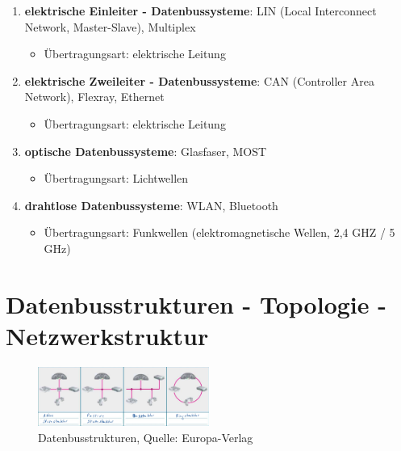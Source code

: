 \begin{enumerate}
\item
  \textbf{elektrische Einleiter - Datenbussysteme}: LIN (Local
  Interconnect Network, Master-Slave), Multiplex

  \begin{itemize}
  \item
    Übertragungsart: elektrische Leitung
  \end{itemize}
\item
  \textbf{elektrische Zweileiter - Datenbussysteme}: CAN (Controller
  Area Network), Flexray, Ethernet

  \begin{itemize}
  \item
    Übertragungsart: elektrische Leitung
  \end{itemize}
\item
  \textbf{optische Datenbussysteme}: Glasfaser, MOST

  \begin{itemize}
  \item
    Übertragungsart: Lichtwellen
  \end{itemize}
\item
  \textbf{drahtlose Datenbussysteme}: WLAN, Bluetooth

  \begin{itemize}
  \item
    Übertragungsart: Funkwellen (elektromagnetische Wellen, 2,4 GHZ / 5
    GHz)
  \end{itemize}
\end{enumerate}

\newpage

\section{Datenbusstrukturen - Topologie -
Netzwerkstruktur}\label{datenbusstrukturen-topologie-netzwerkstruktur}

\begin{figure}[!ht]%
\centering
\includegraphics[width=0.5\textwidth]{images/CAN-Bus/CAN-Bus-6.pdf}
\caption{Datenbusstrukturen, Quelle: Europa-Verlag}
\end{figure}

